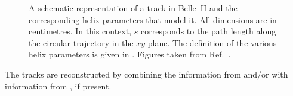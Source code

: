 \begin{figure}[htbp!]
    \centering
    \caption{\label{fig:helix} A schematic representation of a track in Belle~II and the corresponding helix parameters that model it.
    All dimensions are in centimetres.
    In this context, $s$ corresponds to the path length along the circular trajectory in the $xy$ plane.
    The definition of the various helix parameters is given in .
    Figures taken from Ref.~\cite{BelleIITrackingGroup:2020hpx}.
    }
\end{figure}
The tracks are reconstructed by combining the information from \CDC and/or \SVD with information from \PXD, if present.

